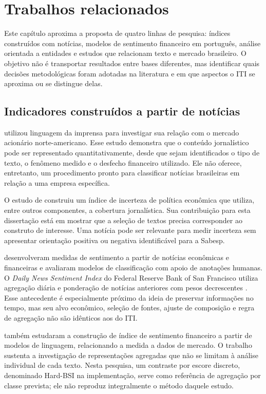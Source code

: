 \chapter{Trabalhos relacionados}
\label{cap:relacionados}

Este capítulo aproxima a proposta de quatro linhas de pesquisa: índices construídos com notícias, modelos de sentimento financeiro em português, análise orientada a entidades e estudos que relacionam texto e mercado brasileiro. O objetivo não é transportar resultados entre bases diferentes, mas identificar quais decisões metodológicas foram adotadas na literatura e em que aspectos o ITI se aproxima ou se distingue delas.

\section{Indicadores construídos a partir de notícias}

 utilizou linguagem da imprensa para investigar sua relação com o mercado acionário norte-americano. Esse estudo demonstra que o conteúdo jornalístico pode ser representado quantitativamente, desde que sejam identificados o tipo de texto, o fenômeno medido e o desfecho financeiro utilizado. Ele não oferece, entretanto, um procedimento pronto para classificar notícias brasileiras em relação a uma empresa específica.

O estudo de  construiu um índice de incerteza de política econômica que utiliza, entre outros componentes, a cobertura jornalística. Sua contribuição para esta dissertação está em mostrar que a seleção de textos precisa corresponder ao construto de interesse. Uma notícia pode ser relevante para medir incerteza sem apresentar orientação positiva ou negativa identificável para a Sabesp.

 desenvolveram medidas de sentimento a partir de notícias econômicas e financeiras e avaliaram modelos de classificação com apoio de anotações humanas. O \emph{Daily News Sentiment Index} do Federal Reserve Bank of San Francisco utiliza agregação diária e ponderação de notícias anteriores com pesos decrescentes \cite{frbsfNewsSentiment,buckman2020dnsi}. Esse antecedente é especialmente próximo da ideia de preservar informações no tempo, mas seu alvo econômico, seleção de fontes, ajuste de composição e regra de agregação não são idênticos aos do ITI.

 também estudaram a construção de índice de sentimento financeiro a partir de modelos de linguagem, relacionando a medida a dados de mercado. O trabalho sustenta a investigação de representações agregadas que não se limitam à análise individual de cada texto. Nesta pesquisa, um contraste por escore discreto, denominado Hard-BSI na implementação, serve como referência de agregação por classe prevista; ele não reproduz integralmente o método daquele estudo.

